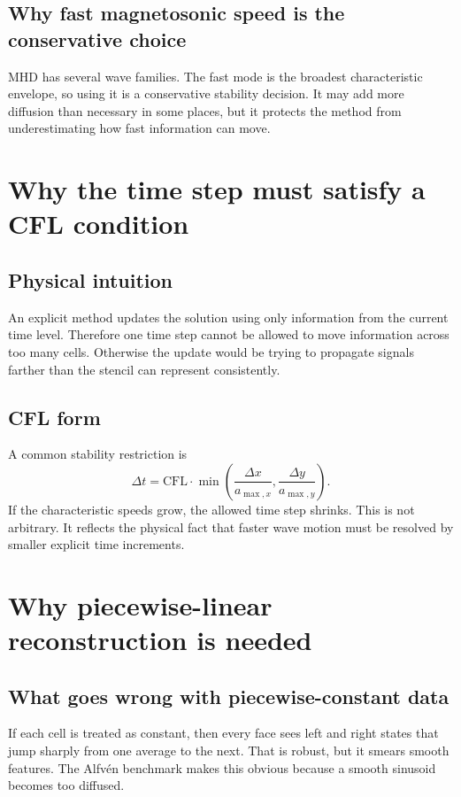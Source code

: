 \documentclass[11pt]{article}
\begin{document}
\subsection{Why fast magnetosonic speed is the conservative choice}
MHD has several wave families. The fast mode is the broadest characteristic envelope, so using it is a conservative stability decision. It may add more diffusion than necessary in some places, but it protects the method from underestimating how fast information can move.

\section{Why the time step must satisfy a CFL condition}

\subsection{Physical intuition}
An explicit method updates the solution using only information from the current time level. Therefore one time step cannot be allowed to move information across too many cells. Otherwise the update would be trying to propagate signals farther than the stencil can represent consistently.

\subsection{CFL form}
A common stability restriction is
\begin{equation}
\Delta t
=
\mathrm{CFL}
\cdot
\min
\left(
\frac{\Delta x}{a_{\max,x}},
\frac{\Delta y}{a_{\max,y}}
\right).
\label{eq:m4-cfl}
\end{equation}
If the characteristic speeds grow, the allowed time step shrinks. This is not arbitrary. It reflects the physical fact that faster wave motion must be resolved by smaller explicit time increments.

\section{Why piecewise-linear reconstruction is needed}

\subsection{What goes wrong with piecewise-constant data}
If each cell is treated as constant, then every face sees left and right states that jump sharply from one average to the next. That is robust, but it smears smooth features. The Alfv\'en benchmark makes this obvious because a smooth sinusoid becomes too diffused.
\end{document}
